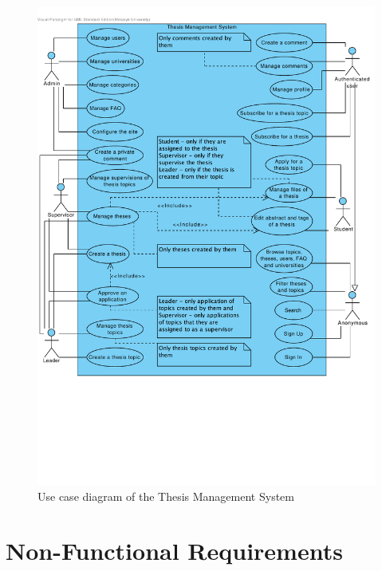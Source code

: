 \begin{figure}[H]
    \centering
        \includegraphics[trim=0 190 10 30, clip, keepaspectratio, width=\textwidth]{./images/use-case.pdf}
    \caption{Use case diagram of the Thesis Management System}
    \label{fig:use-case}
\end{figure}

\section{Non-Functional Requirements}
\label{sec:non-func-requirements}

